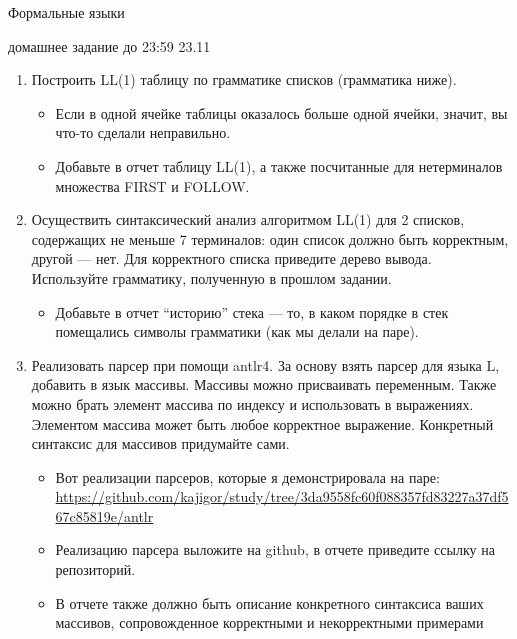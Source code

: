\documentclass[12pt]{article}
\begin{document}
\begin{center} {\LARGE Формальные языки} \end{center}

\begin{center} \Large домашнее задание до 23:59 23.11 \end{center}
\bigskip

\begin{enumerate}
  \item
  {
    Построить LL(1) таблицу по грамматике списков (грамматика ниже).
    \begin{itemize}
      \item Если в одной ячейке таблицы оказалось больше одной ячейки, значит, вы что-то сделали неправильно.
      \item Добавьте в отчет таблицу LL(1), а также посчитанные для нетерминалов множества FIRST и FOLLOW.
    \end{itemize}
  }
  \item
  {
    Осуществить синтаксический анализ алгоритмом LL(1) для 2 списков, содержащих не меньше 7 терминалов: один список должно быть корректным, другой --- нет. Для корректного списка приведите дерево вывода. Используйте грамматику, полученную в прошлом задании.
    \begin{itemize}
      \item Добавьте в отчет ``историю'' стека --- то, в каком порядке в стек помещались символы грамматики (как мы делали на паре).
    \end{itemize}
  }
  \item
  {
    Реализовать парсер при помощи antlr4. За основу взять парсер для языка L, добавить в язык массивы. Массивы можно присваивать переменным. Также можно брать элемент массива по индексу и использовать в выражениях. Элементом массива может быть любое корректное выражение. Конкретный синтаксис для массивов придумайте сами.
    \begin{itemize}
      \item Вот реализации парсеров, которые я демонстрировала на паре: \url{https://github.com/kajigor/study/tree/3da9558fc60f088357fd83227a37df567c85819e/antlr}
      \item Реализацию парсера выложите на github, в отчете приведите ссылку на репозиторий.
      \item В отчете также должно быть описание конкретного синтаксиса ваших массивов, сопровожденное корректными и некорректными примерами
    \end{itemize}
  }
\end{enumerate}
\end{document}
